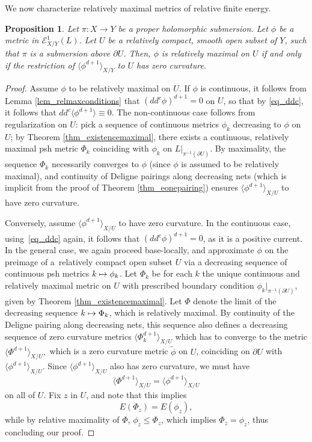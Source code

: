 \documentclass[JEP,XML,SOM,Unicode,NoEqCountersInSection,published]{cedram}
\def\mto{\mathchoice{\longmapsto}{\mapsto}{\mapsto}{\mapsto}}
\newtheorem{prop}[theorem]{Proposition}
\theoremstyle{definition}
\newcommand\cE{\mathcal{E}}
\newcommand\mi{^{-1}}
\begin{document}
We now characterize relatively maximal metrics of relative finite energy.
\begin{prop}\label{prop_harmonicitymaximaldiscs}
Let $\pi:X\to Y$ be a proper holomorphic submersion. Let $\phi$ be a metric in $\cE^1_{X/Y}(L)$. Let $U$ be a relatively compact, smooth open subset of $Y$, such that $\pi$ is a submersion above $\partial U$. Then, $\phi$ is relatively maximal on $U$ if and only if the restriction of $\langle \phi^{d+1}\rangle_{X/Y}$ to $U$ has zero curvature.
\end{prop}
\begin{proof}
Assume $\phi$ to be relatively maximal on $U$. If $\phi$ is continuous, it follows from Lemma \ref{lem_relmaxconditions} that $(dd^c\phi)^{d+1} = 0$ on $U$, so that by \eqref{eq_ddc}, it follows that $dd^c \langle \phi^{d+1}\rangle\equiv0$. The non-continuous case follows from regularization on $U$: pick a sequence of continuous metrics $\phi_k$ decreasing to $\phi$ on $U$; by Theorem \ref{thm_existencemaximal}, there exists a continuous, relatively maximal psh metric $\Phi_k$ coinciding with $\phi_k$ on $L|_{\pi\mi(\partial U)}$. By maximality, the sequence $\Phi_k$ necessarily converges to $\phi$ (since $\phi$ is assumed to be relatively maximal), and continuity of Deligne pairings along decreasing nets (which is implicit from the proof of Theorem \ref{thm_eonepairing}) ensures $\langle \phi^{d+1}\rangle_{X/U}$ to have zero curvature.

Conversely, assume $\langle \phi^{d+1}\rangle_{X/U}$ to have zero curvature. In the continuous case, \hbox{using}~\eqref{eq_ddc} again, it follows that $(dd^c\phi)^{d+1}=0$, as it is a positive current. In the general case, we again proceed base-locally, and approximate $\phi$ on the preimage of a~relatively compact open subset $U$ via a decreasing sequence of continuous psh metrics $k\mto \phi_k$. Let $\Phi_k$ be for each $k$ the unique continuous and relatively maximal metric on $U$ with prescribed boundary condition $\phi_k|_{\pi\mi(\partial U)}$, given by Theorem \ref{thm_existencemaximal}. Let $\Phi$ denote the limit of the decreasing sequence $k\mto \Phi_k$, which is relatively maximal. By continuity of the Deligne pairing along decreasing nets, this sequence also defines a decreasing sequence of zero curvature metrics $\langle \Phi_k^{d+1}\rangle_{X/U}$
which has to converge to the metric $\langle \Phi^{d+1}\rangle_{X/U},$ which is a zero curvature metric $\tilde\phi$ on $U$, coinciding on $\partial U$ with $\langle \phi^{d+1}\rangle_{X/U}$. Since $\langle \phi^{d+1}\rangle_{X/U}$ also has zero curvature, we must have
\[
\langle \Phi^{d+1}\rangle_{X/U}=\langle \phi^{d+1}\rangle_{X/U}
\]
on all of $U$. Fix $z$ in $U$, and note that this implies
\[
E(\Phi_z)=E(\phi_z),
\]
while by relative maximality of $\Phi$, $\phi_z\leq \Phi_z$, which implies $\Phi_z=\phi_z$, thus concluding our proof.
\end{proof}
\end{document}
